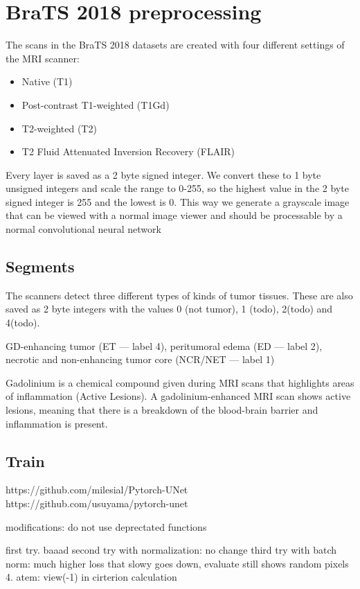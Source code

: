 \chapter{BraTS 2018 preprocessing}
The scans in the BraTS 2018 datasets are created with four different settings of the MRI scanner:

\begin{itemize}
    \item Native (T1)
    \item Post-contrast T1-weighted (T1Gd)
    \item T2-weighted (T2)
    \item T2 Fluid Attenuated Inversion Recovery (FLAIR)
\end{itemize}

Every layer is saved as a 2 byte signed integer. We convert these to 1 byte unsigned integers and scale the range to 0-255, so the highest value in the 2 byte signed integer is 255 and the lowest is 0.
This way we generate a grayscale image that can be viewed with a normal image viewer and should be processable by a normal convolutional neural network

\section{Segments}
The scanners detect three different types of kinds of tumor tissues. These are also saved as 2 byte integers with the values 0 (not tumor), 1 (todo), 2(todo) and 4(todo).


GD-enhancing tumor (ET — label 4),
peritumoral edema (ED — label 2),
necrotic and non-enhancing tumor core (NCR/NET — label 1)



Gadolinium is a chemical compound given during MRI scans that highlights areas of inflammation (Active Lesions). A gadolinium-enhanced  MRI scan shows active lesions, meaning that there is a breakdown of the blood-brain barrier and inflammation is present.


\section{Train}
https://github.com/milesial/Pytorch-UNet
https://github.com/usuyama/pytorch-unet

modifications: do not use deprectated functions

first try. baaad
second try with normalization: no change
third try with batch norm: much higher loss that slowy goes down, evaluate still shows random pixels
4. atem: view(-1) in cirterion calculation